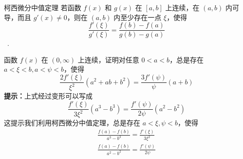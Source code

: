 \begin{theorem}{柯西微分中值定理}\label{the_MeanTh_3}
若函数 $f(x)$ 和 $g(x)$ 在 $[a,b]$ 上连续，在 $(a,b)$ 内可导，而且 $g'(x)\neq 0$，则在 $(a,b)$ 内至少存在一点 $\xi$，使得
\begin{equation}\label{eq_MeanTh_1}{}
\frac{f'(\xi)}{g'(\xi)}=\frac{f(b)-f(a)}{g(b)-g(a)}
\end{equation}~.
\end{theorem}
\begin{exercise}{}
函数 $f(x)$ 在 $(0,\infty)$ 上连续，证明对任意 $0 < a < b$，总是存在 $a < \xi < b, a< \psi <b$，使得
\begin{equation}
\frac{2f'(\xi)}{\xi^2}(a^2+ab+b^2)=\frac{3f'(\psi)}{\psi}(a+b)
\end{equation}
\textbf{提示：}上式经过变形可以写成
\begin{equation}
\frac{f'(\xi)}{3\xi^2}(a^3-b^3)=\frac{f'(\psi)}{2\psi}(a^2-b^2)
\end{equation}
这提示我们利用柯西微分中值定理，总是存在 $a<\xi,\psi<b$，使得
\begin{equation}
\begin{aligned}
\frac{f(a)-f(b)}{a^3-b^3}=\frac{f'(\xi)}{3\xi^2}\\
\frac{f(a)-f(b)}{a^2-b^2}=\frac{f'(\psi)}{2\psi}
\end{aligned}
\end{equation}
\end{exercise}